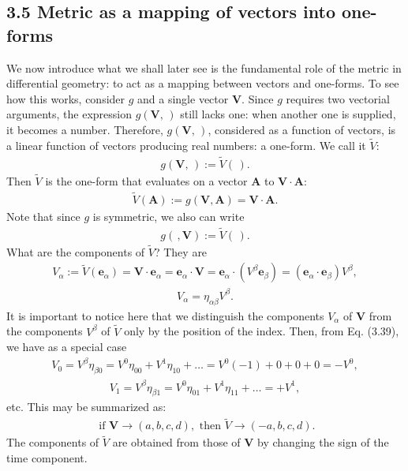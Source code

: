 \documentclass[12pt]{book}
\begin{document}
    \subsection{3.5 Metric as a mapping of vectors into one-forms}
    We now introduce what we shall later see is the fundamental role of the metric in differential geometry: to act as a mapping between vectors and one-forms. To see how this works, consider \(g\) and a single vector \(\mathbf{V}\). Since \(g\) requires two vectorial arguments, the expression \(g(\mathbf{V}, \,)\) still lacks one: when another one is supplied, it becomes a number. Therefore, \(g(\mathbf{V}, \,)\), considered as a function of vectors, is a linear function of vectors producing real numbers: a one-form. We call it \(\tilde{V}\):
    \begin{align}
    g(\mathbf{V}, \,) := \tilde{V}( \,). \tag{3.37}
    \end{align}
    Then \(\tilde{V}\) is the one-form that evaluates on a vector \(\mathbf{A}\) to \(\mathbf{V} \cdot \mathbf{A}\):
    \begin{align}
    \tilde{V}(\mathbf{A}) := g(\mathbf{V},\mathbf{A}) = \mathbf{V} \cdot \mathbf{A}. \tag{3.38}
    \end{align}
    Note that since \(g\) is symmetric, we also can write
    \begin{align}
    g( \,, \mathbf{V}) := \tilde{V}( \,).
    \end{align}
    What are the components of \(\tilde{V}\)? They are
    \begin{align}
    V_\alpha := \tilde{V}(\mathbf{e}_\alpha) = \mathbf{V} \cdot \mathbf{e}_\alpha = \mathbf{e}_\alpha \cdot \mathbf{V}
    = \mathbf{e}_\alpha \cdot (V^\beta \mathbf{e}_\beta)
    = (\mathbf{e}_\alpha \cdot \mathbf{e}_\beta)V^\beta,
    \end{align}
    \begin{align}
    V_\alpha = \eta_{\alpha\beta}V^\beta. \tag{3.39}
    \end{align}
    It is important to notice here that we distinguish the components \(V_\alpha\) of \(\mathbf{V}\) from the components \(V^\beta\) of \(\tilde{V}\) only by the position of the index. Then, from Eq. (3.39), we have as a special case
    \begin{align}
    V_0 = V^\beta \eta_{\beta 0} = V^0 \eta_{00} + V^1 \eta_{10} + \dots 
    = V^0(-1) + 0 + 0 + 0 
    = -V^0, \tag{3.40}
    \end{align}
    \begin{align}
    V_1 = V^\beta \eta_{\beta 1} = V^0 \eta_{01} + V^1 \eta_{11} + \dots 
    = +V^1, \tag{3.41}
    \end{align}
    etc. This may be summarized as: 
    \begin{align}
    \text{ if } \mathbf{V} \rightarrow (a, b, c, d),
    \text{ then } \tilde{V} \rightarrow (-a, b, c, d). \tag{3.42}
    \end{align}
    The components of \(\tilde{V}\) are obtained from those of \(\mathbf{V}\) by changing the sign of the time component. 
    
\end{document}
